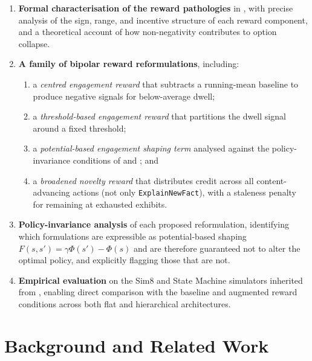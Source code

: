 \documentclass[12pt,a4paper]{article}
\begin{document}
\begin{enumerate}[nosep]
    \item \textbf{Formal characterisation of the reward pathologies} in \citet{bourdon2025}, with precise analysis of the sign, range, and incentive structure of each reward component, and a theoretical account of how non-negativity contributes to option collapse.

    \item \textbf{A family of bipolar reward reformulations}, including:
    \begin{enumerate}[nosep,label=(\alph*)]
        \item a \emph{centred engagement reward} that subtracts a running-mean baseline to produce negative signals for below-average dwell;
        \item a \emph{threshold-based engagement reward} that partitions the dwell signal around a fixed threshold;
        \item a \emph{potential-based engagement shaping term} analysed against the policy-invariance conditions of \citet{ng1999} and \citet{devlin2012}; and
        \item a \emph{broadened novelty reward} that distributes credit across all content-advancing actions (not only \texttt{ExplainNewFact}), with a staleness penalty for remaining at exhausted exhibits.
    \end{enumerate}

    \item \textbf{Policy-invariance analysis} of each proposed reformulation, identifying which formulations are expressible as potential-based shaping $F(s, s') = \gamma \Phi(s') - \Phi(s)$ and are therefore guaranteed not to alter the optimal policy, and explicitly flagging those that are not.

    \item \textbf{Empirical evaluation} on the Sim8 and State Machine simulators inherited from \citet{bourdon2025}, enabling direct comparison with the baseline and augmented reward conditions across both flat and hierarchical architectures.
\end{enumerate}

\section{Background and Related Work}
\label{sec:related}
\end{document}
